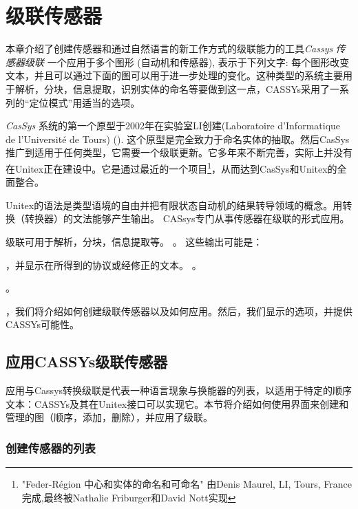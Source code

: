 \chapter{级联传感器}
\label{chap-cassys}

本章介绍了创建传感器和通过自然语言的新工作方式的级联能力的工具\textit{Cassys} 
 \textit{传感器级联} 
一个应用于多个图形 (自动机和传感器), 表示于下列文字: 每个图形改变文本，并且可以通过下面的图可以用于进一步处理的变化。这种类型的系统主要用于解析，分块，信息提取，识别实体的命名等要做到这一点，CASSYs采用了一系列的“定位模式”用适当的选项。

\bigskip
\noindent \textit{CasSys} 系统的第一个原型于2002年在实验室LI创建(Laboratoire d'Informatique de l'Université de Tours) (\cite{these-nathalie}). 
这个原型是完全致力于命名实体的抽取。然后CasSys推广到适用于任何类型，它需要一个级联更新。它多年来不断完善，实际上并没有在Unitex正在建设中。它是通过最近的一个项目\footnote{"Feder-Région 中心和实体的命名和可命名" 由Denis Maurel, LI, Tours, France完成,最终被Nathalie Friburger和David Nott实现}，从而达到CasSys和Unitex的全面整合。

Unitex的语法是类型语境的自由并把有限状态自动机的结果转导领域的概念。用转换（转换器）的文法能够产生输出。 CASsys专门从事传感器在级联的形式应用。

\bigskip
级联可用于解析，分块，信息提取等。
。
这些输出可能是：
\begin{itemize}
，并显示在所得到的协议或经修正的文本。
。
\end{itemize}
。

\bigskip
{}，我们将介绍如何创建级联传感器以及如何应用。然后，我们显示的选项，并提供CASSYs可能性。

\section{应用CASSYs级联传感器}
\label{section:applyCascade}
应用与Cassys转换级联是代表一种语言现象与换能器的列表，以适用于特定的顺序文本：CASSYs及其在Unitex接口可以实现它。本节将介绍如何使用界面来创建和管理的图（顺序，添加，删除），并应用了级联。 

\subsection{创建传感器的列表}
\label{subsec:listTrans}

